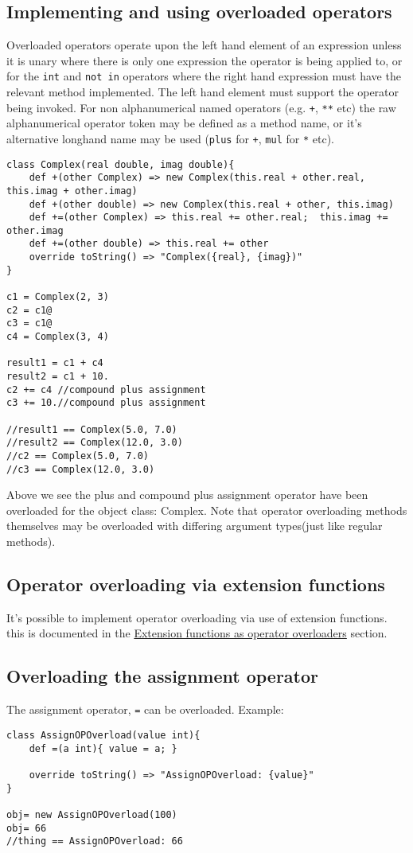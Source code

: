 \documentclass[conc-doc]{subfiles}
\begin{document}
\subsection{Implementing and using overloaded operators}
Overloaded operators operate upon the left hand element of an expression unless it is unary where there is only one expression the operator is being applied to, or for the \lstinline{int} and \lstinline{not in} operators where the right hand expression must have the relevant method implemented. The left hand element must support the operator being invoked. For non alphanumerical named operators (e.g. \lstinline{+}, \lstinline{**} etc) the raw alphanumerical operator token may be defined as a method name, or it's alternative longhand name may be used (\lstinline{plus} for \lstinline{+}, \lstinline{mul} for \lstinline{*} etc).

\begin{lstlisting}
class Complex(real double, imag double){
	def +(other Complex) => new Complex(this.real + other.real, this.imag + other.imag)
	def +(other double) => new Complex(this.real + other, this.imag)
	def +=(other Complex) => this.real += other.real;  this.imag += other.imag
	def +=(other double) => this.real += other
	override toString() => "Complex({real}, {imag})"
}

c1 = Complex(2, 3)
c2 = c1@
c3 = c1@
c4 = Complex(3, 4)

result1 = c1 + c4
result2 = c1 + 10.
c2 += c4 //compound plus assignment
c3 += 10.//compound plus assignment

//result1 == Complex(5.0, 7.0)
//result2 == Complex(12.0, 3.0)
//c2 == Complex(5.0, 7.0)
//c3 == Complex(12.0, 3.0)
\end{lstlisting}

Above we see the plus and compound plus assignment operator have been overloaded for the object class: Complex. Note that operator overloading methods themselves may be overloaded with differing argument types(just like regular methods).

\subsection{Operator overloading via extension functions}
It's possible to implement operator overloading via use of extension functions. this is documented in the \hyperref[sec:extfunAsOpOver]{Extension functions as operator overloaders} section.

\subsection{Overloading the assignment operator}
\label{subsec:overloadassignmentop}
The assignment operator, \lstinline{=} can be overloaded. Example:
\begin{lstlisting}
class AssignOPOverload(value int){
	def =(a int){ value = a; }
	
	override toString() => "AssignOPOverload: {value}"
}

obj= new AssignOPOverload(100)
obj= 66
//thing == AssignOPOverload: 66
\end{lstlisting}
\end{document}
